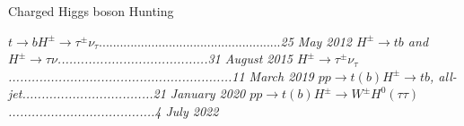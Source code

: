 \begin{MyArticle}[enhanced, tikz={rotate=0}, width=1.0\textwidth]{\huge Charged Higgs boson Hunting}

  \Large{$t\rightarrow bH^{\pm}\rightarrow \tau^{\pm} \nu_{\tau}$}....................................................\it{\Large 25 May 2012}\newline
  \Large{$H^{\pm}\rightarrow tb$ and $H^{\pm}\rightarrow \tau\nu$}.......................................\it{\Large 31 August 2015}\newline
  \Large{$H^{\pm} \rightarrow \tau^{\pm} \nu_{\tau}$}..........................................................\it{\Large 11 March 2019}\newline
  \Large{$pp\rightarrow t(b)H^{\pm} \rightarrow tb$, all-jet}..................................\it{\Large 21 January 2020}\newline
  \Large{$pp\rightarrow t(b)H^{\pm} \rightarrow W^{\pm}H^{0}(\tau\tau)$}......................................\it{\Large 4 July 2022}
\end{MyArticle}

